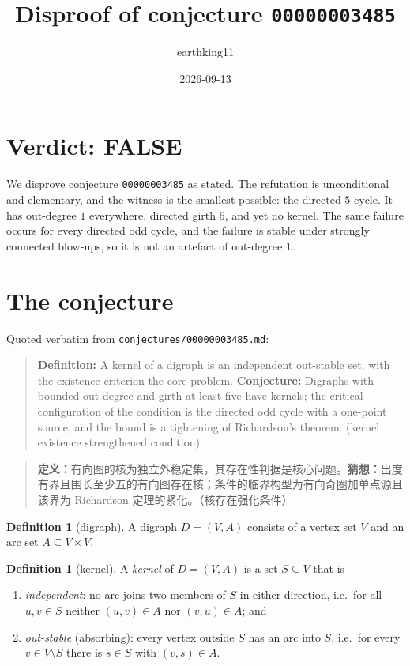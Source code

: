 \documentclass[11pt]{article}
\title{Disproof of conjecture \texttt{00000003485}}
\author{earthking11}
\date{2026-09-13}
\theoremstyle{definition}
\newtheorem{definition}[theorem]{Definition}
\theoremstyle{remark}
\begin{document}
\sloppy
\maketitle

\section*{Verdict: FALSE}

We disprove conjecture \texttt{00000003485} as stated. The refutation is
unconditional and elementary, and the witness is the smallest possible: the
directed $5$-cycle. It has out-degree $1$ everywhere, directed girth $5$, and
yet no kernel. The same failure occurs for every directed odd cycle, and the
failure is stable under strongly connected blow-ups, so it is not an artefact of
out-degree $1$.

\section{The conjecture}

Quoted verbatim from \texttt{conjectures/00000003485.md}:

\begin{quote}
\textbf{Definition:} A kernel of a digraph is an independent out-stable set,
with the existence criterion the core problem. \textbf{Conjecture:} Digraphs
with bounded out-degree and girth at least five have kernels; the critical
configuration of the condition is the directed odd cycle with a one-point
source, and the bound is a tightening of Richardson's theorem. (kernel existence
strengthened condition)
\end{quote}

\begin{quote}
\textbf{定义：}有向图的核为独立外稳定集，其存在性判据是核心问题。\textbf{猜想：}出度有界且围长至少五的有向图存在核；条件的临界构型为有向奇圈加单点源且该界为
Richardson 定理的紧化。（核存在强化条件）
\end{quote}

\begin{definition}[digraph]
A digraph $D = (V, A)$ consists of a vertex set $V$ and an arc set
$A \subseteq V \times V$.
\end{definition}

\begin{definition}[kernel]
A \emph{kernel} of $D = (V, A)$ is a set $S \subseteq V$ that is
\begin{enumerate}
\item \emph{independent}: no arc joins two members of $S$ in either direction,
      i.e.\ for all $u, v \in S$ neither $(u, v) \in A$ nor $(v, u) \in A$; and
\item \emph{out-stable} (absorbing): every vertex outside $S$ has an arc into
      $S$, i.e.\ for every $v \in V \setminus S$ there is $s \in S$ with
      $(v, s) \in A$.
\end{enumerate}
\end{definition}
\end{document}
